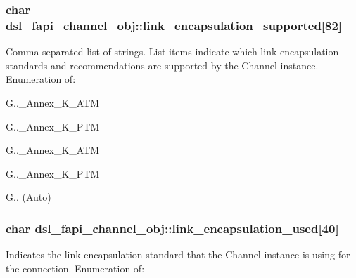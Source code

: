 \hypertarget{structdsl__fapi__channel__obj_a6f327970bafb74d20019e4c9f8351250}{
\subsubsection[{link\-\_\-encapsulation\-\_\-supported}]{\setlength{\rightskip}{0pt plus 5cm}char dsl\-\_\-fapi\-\_\-channel\-\_\-obj\-::link\-\_\-encapsulation\-\_\-supported\mbox{[}82\mbox{]}}}\label{structdsl__fapi__channel__obj_a6f327970bafb74d20019e4c9f8351250}
Comma-\/separated list of strings. List items indicate which link encapsulation standards and recommendations are supported by the Channel instance. Enumeration of\-:
\begin{DoxyItemize}
\item G..\-\_\-\-Annex\-\_\-\-K\-\_\-\-A\-T\-M
\item G..\-\_\-\-Annex\-\_\-\-K\-\_\-\-P\-T\-M
\item G..\-\_\-\-Annex\-\_\-\-K\-\_\-\-A\-T\-M
\item G..\-\_\-\-Annex\-\_\-\-K\-\_\-\-P\-T\-M
\item G.. (Auto) 
\end{DoxyItemize}\hypertarget{structdsl__fapi__channel__obj_a1d0d76c5a7a53c2e2553e546628ed85e}{
\subsubsection[{link\-\_\-encapsulation\-\_\-used}]{\setlength{\rightskip}{0pt plus 5cm}char dsl\-\_\-fapi\-\_\-channel\-\_\-obj\-::link\-\_\-encapsulation\-\_\-used\mbox{[}40\mbox{]}}}\label{structdsl__fapi__channel__obj_a1d0d76c5a7a53c2e2553e546628ed85e}
Indicates the link encapsulation standard that the Channel instance is using for the connection. Enumeration of\-:
